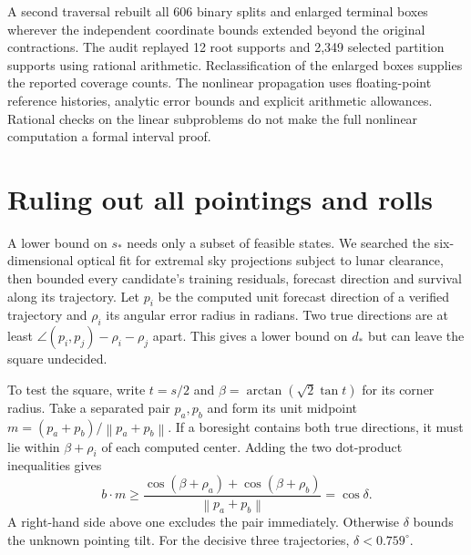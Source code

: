 \documentclass[10pt,letterpaper]{article}
\newcommand{\degc}{^{\circ}}
\newcommand{\norm}[1]{\left\lVert #1\right\rVert}
\newcommand{\dotp}{\mathbin{\cdot}}
\begin{document}
A second traversal rebuilt all 606 binary splits and enlarged terminal boxes wherever the independent coordinate bounds extended beyond the original contractions. The audit replayed 12 root supports and 2,349 selected partition supports using rational arithmetic. Reclassification of the enlarged boxes supplies the reported coverage counts. The nonlinear propagation uses floating-point reference histories, analytic error bounds and explicit arithmetic allowances. Rational checks on the linear subproblems do not make the full nonlinear computation a formal interval proof.

\section{Ruling out all pointings and rolls}

A lower bound on $s_*$ needs only a subset of feasible states. We searched the six-dimensional optical fit for extremal sky projections subject to lunar clearance, then bounded every candidate's training residuals, forecast direction and survival along its trajectory. Let $p_i$ be the computed unit forecast direction of a verified trajectory and $\rho_i$ its angular error radius in radians. Two true directions are at least $\angle(p_i,p_j)-\rho_i-\rho_j$ apart. This gives a lower bound on $d_*$ but can leave the square undecided.

To test the square, write $t=s/2$ and $\beta=\arctan(\sqrt{2}\tan t)$ for its corner radius. Take a separated pair $p_a,p_b$ and form its unit midpoint $m=(p_a+p_b)/\norm{p_a+p_b}$. If a boresight contains both true directions, it must lie within $\beta+\rho_i$ of each computed center. Adding the two dot-product inequalities gives
\begin{equation}
 b\dotp m\geq
 \frac{\cos(\beta+\rho_a)+\cos(\beta+\rho_b)}{\norm{p_a+p_b}}=\cos\delta .
 \label{eq:tilt}
\end{equation}
A right-hand side above one excludes the pair immediately. Otherwise $\delta$ bounds the unknown pointing tilt. For the decisive three trajectories, $\delta<0.759\degc$.
\end{document}

